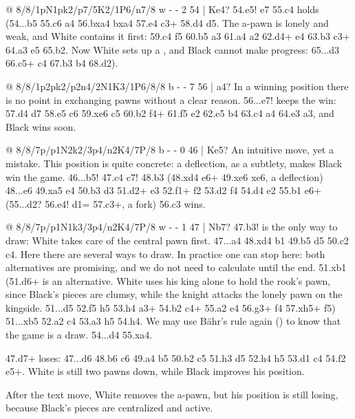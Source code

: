 @ 8/8/1pN1pk2/p7/5K2/1P6/n7/8 w - - 2 54 | Ke4?
54.\N e5! \K e7 55.\N c4 holds (54...b5 55.\N c6 a4 56.bxa4 bxa4 57.\K e4 \N c3+ 58.\K d4 \N d5.
The a-pawn is lonely and weak, and White contains it first: 59.\K c4 \K f5 60.\K b5 a3 61.\K a4 a2
62.\N d4+ \K e4 63.\N b3 \N c3+ 64.\K a3 e5 65.\K b2. Now White sets up a
, and Black cannot make progress: 65...\K d3 66.\N c5+ \K c4 67.\N b3
\K b4 68.\N d2).

@ 8/8/1p2pk2/p2n4/2N1K3/1P6/8/8 b - - 7 56 | a4?
In a winning position there is no point in exchanging pawns without a clear reason. 56...\K e7!
keeps the win: 57.\K d4 \K d7 58.\K e5 \K c6 59.\K xe6 \K c5 60.\N b2 \N f4+ 61.\K f5 \N e2 62.\K e5
\K b4 63.\N c4 a4 64.\N e3 a3, and Black wins soon.

@ 8/8/7p/p1N2k2/3p4/n2K4/7P/8 b - - 0 46 | Ke5?
An intuitive move, yet a mistake. This position is quite concrete: a deflection, as a subtlety,
makes Black win the game. 46...\N b5! 47.\K c4 \N c7! 48.\N b3 (48.\K xd4 \N e6+ 49.\N xe6
\K xe6, a deflection) 48...\N e6 49.\N xa5 \K e4 50.\N b3 d3 51.\N d2+ \K e3 52.\N f1+
\K f2 53.\N d2 \N f4 54.\K d4 \K e2 55.\N b1 \N e6+ (55...d2? 56.\K e4! d1=\Q{} 57.\N c3+, a
fork) 56.\K c3 wins.

@ 8/8/7p/p1N1k3/3p4/n2K4/7P/8 w - - 1 47 | Nb7?
47.\N b3! is the only way to draw: White takes care of the central pawn first. 47...a4 48.\N xd4
\N b1 49.\N b5 \K d5 50.\K c2 \K c4. Here there are several ways to draw. In practice one can stop
here: both alternatives are promising, and we do not need to calculate until the end. 51.\K xb1
(51.\N d6+ is an alternative. White uses his king alone to hold the rook's pawn, since Black's
pieces are clumsy, while the knight attacks the lonely pawn on the kingside. 51...\K d5 52.\N f5 h5
53.h4 \N a3+ 54.\K b2 \N c4+ 55.\K a2 \K e4 56.\N g3+ \K f4 57.\N xh5+ \K f5) 51...\K xb5 52.\K a2
\K c4 53.\K a3 h5 54.h4. We may use Bähr's rule again () to know that the
game is a draw. 54...\K d4 55.\K xa4.

47.\N d7+ loses: 47...\K d6 48.\N b6 \K c6 49.\N a4 \K b5 50.\N b2 \K c5 51.h3 \K d5 52.h4 h5
53.\N d1 \N c4 54.\N f2 \N e5+. White is still two pawns down, while Black improves his position.

After the text move, White removes the a-pawn, but his position is still losing, because Black's
pieces are centralized and active.

